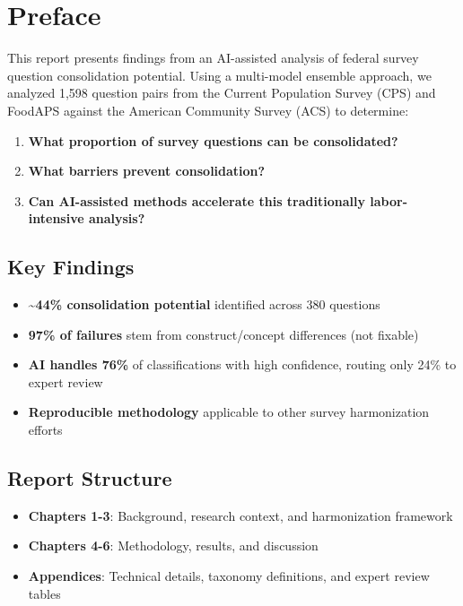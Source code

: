 \documentclass[
  letterpaper,
]{report}
\providecommand{\tightlist}{%
  \setlength{\itemsep}{0pt}\setlength{\parskip}{0pt}}
\begin{document}

\chapter*{Preface}\label{preface}


This report presents findings from an AI-assisted analysis of federal
survey question consolidation potential. Using a multi-model ensemble
approach, we analyzed 1,598 question pairs from the Current Population
Survey (CPS) and FoodAPS against the American Community Survey (ACS) to
determine:

\begin{enumerate}
\def\labelenumi{\arabic{enumi}.}
\tightlist
\item
  \textbf{What proportion of survey questions can be consolidated?}
\item
  \textbf{What barriers prevent consolidation?}
\item
  \textbf{Can AI-assisted methods accelerate this traditionally
  labor-intensive analysis?}
\end{enumerate}

\section{Key Findings}\label{key-findings}

\begin{itemize}
\tightlist
\item
  \textbf{\textasciitilde44\% consolidation potential} identified across
  380 questions
\item
  \textbf{97\% of failures} stem from construct/concept differences (not
  fixable)
\item
  \textbf{AI handles 76\%} of classifications with high confidence,
  routing only 24\% to expert review
\item
  \textbf{Reproducible methodology} applicable to other survey
  harmonization efforts
\end{itemize}

\section{Report Structure}\label{report-structure}

\begin{itemize}
\tightlist
\item
  \textbf{Chapters 1-3}: Background, research context, and harmonization
  framework
\item
  \textbf{Chapters 4-6}: Methodology, results, and discussion
\item
  \textbf{Appendices}: Technical details, taxonomy definitions, and
  expert review tables
\end{itemize}
\end{document}
